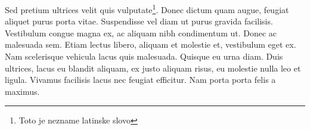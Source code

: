 \documentclass{book}
\begin{document}
Sed pretium ultrices velit quis vulputate\footnote{Toto je nezname latinske slovo}. Donec dictum quam augue, feugiat aliquet purus porta vitae. Suspendisse vel diam ut purus gravida facilisis. Vestibulum congue magna ex, ac aliquam nibh condimentum ut. Donec ac malesuada sem. Etiam lectus libero, aliquam et molestie et, vestibulum eget ex. Nam scelerisque vehicula lacus quis malesuada. Quisque eu urna diam. Duis ultrices, lacus eu blandit aliquam, ex justo aliquam risus, eu molestie nulla leo et ligula. Vivamus facilisis lacus nec feugiat efficitur. Nam porta porta felis a maximus.
\end{document}
